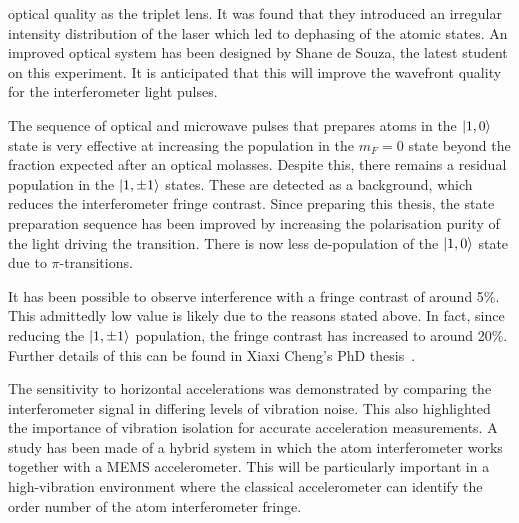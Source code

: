 optical quality as the triplet lens. It was found that they introduced
an irregular intensity distribution of the laser which led to
dephasing of the atomic states. An improved optical system has been
designed by Shane de Souza, the latest student on this experiment. It
is anticipated that this will improve the wavefront quality for the
interferometer light pulses.
\par\noindent
The sequence of optical and microwave pulses that prepares
atoms in the $\ket{1,0}$ state is very effective at increasing
the population in the $m_F = 0$ state beyond the fraction expected
after an optical molasses. Despite this, there remains a residual
population in the $\ket{1,\pm 1}$ states. These are detected as a
background, which reduces the interferometer fringe contrast. Since
preparing this thesis, the state preparation sequence has been
improved by increasing the polarisation purity of the light driving
the  transition. There is now less de-population of the
$\ket{1,0}$ state due to $\pi$-transitions. 
\par\noindent
It has been possible to observe interference with a fringe contrast of
around 5\%. This admittedly low value is likely due to the reasons
stated above. In fact, since reducing the $\ket{1,\pm 1}$ population,
the fringe contrast has increased to around 20\%. Further details of
this can be found in Xiaxi Cheng's PhD thesis~\cite{Cheng2018}.
\par\noindent
The sensitivity to horizontal accelerations was demonstrated by
comparing the interferometer signal in differing levels of vibration
noise. This also highlighted the importance of vibration isolation for
accurate acceleration measurements. A study has been made of a hybrid
system in which the atom interferometer works together with a MEMS
accelerometer. This will be particularly important in a high-vibration
environment where the classical accelerometer can identify the order
number of the atom interferometer fringe. 
